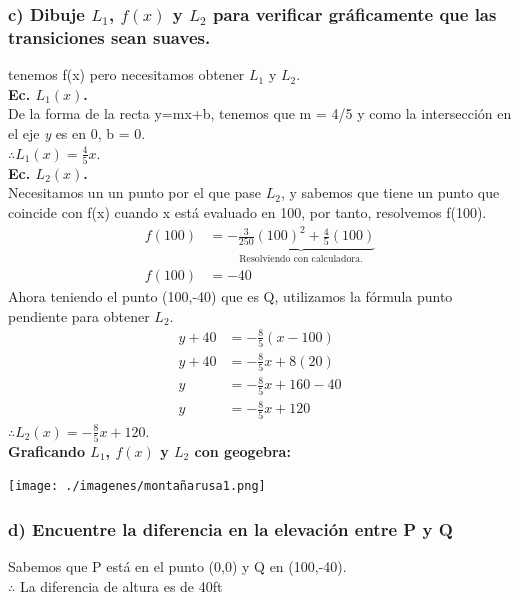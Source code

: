 \documentclass[11pt,letterpaper]{article}
\begin{document}
\subsubsection*{c) Dibuje $L_1$, $f(x)$ y $L_2$ para verificar gráficamente que las transiciones sean suaves.}
tenemos f(x) pero necesitamos obtener $L_1$ y $L_2$. \\
\textbf{Ec. $L_1(x)$.} \\
De la forma de la recta y=mx+b, tenemos que m = 4/5 y como la intersección en el eje \textit{y} es en 0, b = 0. \\
$\therefore L_1(x)=\frac{4}{5}x$. \\
\textbf{Ec. $L_2(x)$.}\\
Necesitamos un un punto por el que pase $L_2$, y sabemos que tiene un punto que coincide con f(x) cuando x está evaluado en 100, por tanto, resolvemos f(100).
\begin{equation*}
  \begin{split}
    f(100) &= \underbrace{-\frac{3}{250}(100)^2+\frac{4}{5}(100)}_{\text{Resolviendo con calculadora.}} \\
    f(100) &= -40
  \end{split}
\end{equation*}
Ahora teniendo el punto (100,-40) que es Q, utilizamos la fórmula punto pendiente para obtener $L_2$.
\begin{equation*}
  \begin{split}
    y+40 &= -\frac{8}{5}(x-100) \\
    y+40 &= -\frac{8}{5}x+8(20) \\
    y &= -\frac{8}{5}x+160-40 \\
    y &= -\frac{8}{5}x+120
  \end{split}
\end{equation*}
$\therefore L_2(x)=-\frac{8}{5}x+120$. \\
\textbf{Graficando $L_1$, $f(x)$ y $L_2$ con geogebra:}
\begin{center}
  \texttt{[image: ./imagenes/montañarusa1.png]}
\end{center}

\subsubsection*{d) Encuentre la diferencia en la elevación entre P y Q}
Sabemos que P está en el punto (0,0) y Q en (100,-40). \\
$\therefore$ La diferencia de altura es de 40ft
\end{document}
